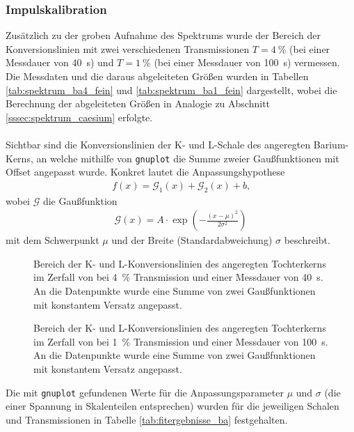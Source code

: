 \documentclass[11pt, a4paper]{article}
\numberwithin{equation}{section}
\begin{document}
\subsubsection{Impulskalibration}
\label{sssec:konversionslinien}
Zusätzlich zu der groben Aufnahme des Spektrums wurde der Bereich der Konversionslinien mit zwei verschiedenen Transmissionen $T = \SI{4}{\percent}$ (bei einer Messdauer von \SI{40}{\second}) und $T = \SI{1}{\percent}$ (bei einer Messdauer von \SI{100}{\second}) vermessen.
Die Messdaten und die daraus abgeleiteten Größen wurden in Tabellen \ref{tab:spektrum_ba4_fein} und \ref{tab:spektrum_ba1_fein} dargestellt, wobei die Berechnung der abgeleiteten Größen in Analogie zu Abschnitt \ref{sssec:spektrum_caesium} erfolgte.
\\
\\
Sichtbar sind die Konversionslinien der K- und L-Schale des angeregten Barium-Kerns, an welche mithilfe von \texttt{gnuplot} die Summe zweier Gaußfunktionen mit Offset angepasst wurde. Konkret lautet die Anpassungshypothese
\begin{align*}
	f(x) = \mathcal{G}_1(x) + \mathcal{G}_2(x) + b \text{,}
\end{align*}
wobei $\mathcal{G}$ die Gaußfunktion
\begin{align*}
	\mathcal{G}(x) = A \cdot \exp\left( - \frac{(x - \mu)^2}{2 \sigma^2}\right)
\end{align*}
mit dem Schwerpunkt $\mu$ und der Breite (Standardabweichung) $\sigma$ beschreibt.
\begin{figure}[h]
	\centering
	
	\caption{Bereich der K- und L-Konversionslinien des angeregten  Tochterkerns im Zerfall von  bei \SI{4}{\percent} Transmission und einer Messdauer von \SI{40}{\second}. An die Datenpunkte wurde eine Summe von zwei Gaußfunktionen mit konstantem Versatz angepasst.}
	\label{fig:ba_t4_fein}
\end{figure}
\begin{figure}[h]
	\centering
	
	\caption{Bereich der K- und L-Konversionslinien des angeregten  Tochterkerns im Zerfall von  bei \SI{1}{\percent} Transmission und einer Messdauer von \SI{100}{\second}. An die Datenpunkte wurde eine Summe von zwei Gaußfunktionen mit konstantem Versatz angepasst.}
	\label{fig:ba_t1_fein}
\end{figure}
Die mit \texttt{gnuplot} gefundenen Werte für die Anpassungsparameter $\mu$ und $\sigma$ (die einer Spannung in Skalenteilen entsprechen) wurden für die jeweiligen Schalen und Transmissionen in Tabelle \ref{tab:fitergebnisse_ba} festgehalten.
\end{document}

